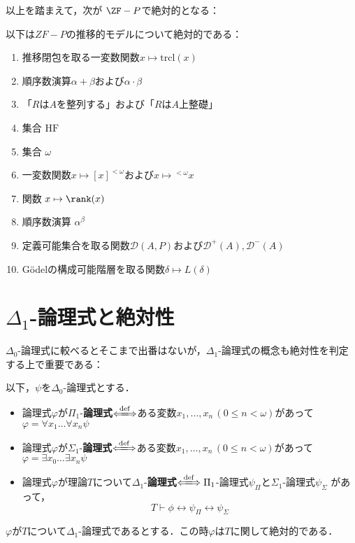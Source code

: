 \documentclass[xelatex,a4j,jadriver=standard]{bxjsarticle}
\newcommand{\HF}{\mathrm{HF}}
\begin{document}
以上を踏まえて，次が $\ZF-P$で絶対的となる：

\begin{theorem}[$ZF-P$で絶対的]
 以下は$ZF-P$の推移的モデルについて絶対的である：
 \begin{enumerate}
  \item 推移閉包を取る一変数関数$x \mapsto \mathrm{trcl}(x)$
  \item 順序数演算$\alpha + \beta$および$\alpha \cdot \beta$
  \item 「$R$は$A$を整列する」および「$R$は$A$上整礎」
  \item 集合 $\HF$
  \item 集合 $\omega$
  \item 一変数関数$x \mapsto [x]^{<\omega}$および$x \mapsto {}^{<\omega} x$
  \item 関数 $x \mapsto \rank(x)$
  \item 順序数演算 $\alpha^\beta$
  \item 定義可能集合を取る関数$\mathcal{D}(A, P)$および$\mathcal{D}^+(A), \mathcal{D}^-(A)$
  \item G\"{o}delの構成可能階層を取る関数$\delta \mapsto L(\delta)$
 \end{enumerate}
\end{theorem}

\section{$\Delta_1$-論理式と絶対性}
$\Delta_0$-論理式に較べるとそこまで出番はないが，$\Delta_1$-論理式の概念も絶対性を判定する上で重要である：

\begin{definition}
 以下，$\psi$を$\Delta_0$-論理式とする．
 
 \begin{itemize}
  \item 論理式$\varphi$が$\Pi_1$-{\bfseries 論理式}$\defs$ある変数$x_1, \dots, x_n\,(0 \leq n < \omega)$があって$\varphi = \forall x_1 \dots \forall x_n \psi$
  \item 論理式$\varphi$が$\Sigma_1$-{\bfseries 論理式}$\defs$ある変数$x_1, \dots, x_n\,(0 \leq n < \omega)$があって$\varphi = \exists x_0 \dots \exists x_n \psi$
  \item 論理式$\varphi$が理論$T$について$\Delta_1$-{\bfseries 論理式}$\defs \Pi_1$-論理式$\psi_\Pi$と$\Sigma_1$-論理式$\psi_\Sigma$ があって，
	\[
	 T \vdash \phi \leftrightarrow \psi_\Pi \leftrightarrow \psi_\Sigma
	\]
 \end{itemize}
\end{definition}

\begin{theorem}
 $\varphi$が$T$について$\Delta_1$-論理式であるとする．この時$\varphi$は$T$に関して絶対的である．
\end{theorem}

\nocite{Kunen:2011,Jech:2002,Arai:2011,Kunen:2009}
\printbibliography[title=参考文献]
\end{document}

